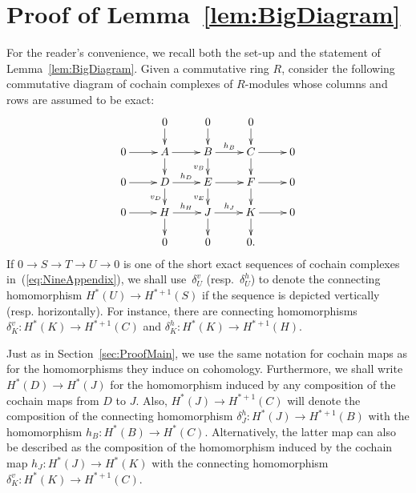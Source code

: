 \documentclass[11pt,a4paper]{amsart}
\theoremstyle{definition}
\begin{document}
\appendix

\section{Proof of Lemma~\ref{lem:BigDiagram}}

For the reader's convenience, we recall both the set-up and the statement of Lemma~\ref{lem:BigDiagram}. Given a commutative ring $R$, consider the following commutative diagram of cochain complexes of $R$-modules whose columns and rows are assumed to be exact:
\begin{equation}
\label{eq:NineAppendix}
\xymatrix@R0.5cm{
  &0 \ar[d]&  0\ar[d]&  0\ar[d]&  \\
0 \ar[r] &A\ar[d] \ar[r]& B \ar[d]_{v_B}\ar[r]^{h_B}& C \ar[r]\ar[d]& 0 \\
0 \ar[r] &D \ar[r]^{h_D}\ar[d]_{v_D}& E \ar[r]\ar[d]_{v_E}& F \ar[r]\ar[d]& 0 \\
0 \ar[r] &H \ar[r]^{h_H}\ar[d]& J \ar[r]^{h_J}\ar[d]& K \ar[r]\ar[d]& 0  \\
  &0 &  0&  0.& 
}\end{equation} 
If $0 \rightarrow S \rightarrow T \rightarrow U \rightarrow 0$ is one of the short exact sequences of cochain complexes in~(\ref{eq:NineAppendix}), we shall use~$\delta_{U}^v$ (resp.~$\delta_{U}^h$) to denote the connecting homomorphism $H^*(U) \rightarrow H^{*+1}(S)$ if the sequence is depicted vertically (resp. horizontally). For instance, there are connecting  homomorphisms $\delta_K^v \colon H^*(K) \to H^{*+1}(C)$ and $\delta_K^h \colon H^*(K) \to H^{*+1}(H)$.

Just as in Section~\ref{sec:ProofMain}, we use the same notation for cochain maps as for the homomorphisms they induce on cohomology. Furthermore, we shall write $H^*(D) \to H^*(J)$ for the homomorphism induced by any composition of the cochain maps from $D$ to $J$. Also, $H^*(J) \to H^{*+1}(C)$ will denote the composition of the connecting homomorphism $\delta^h_J \colon H^*(J) \to H^{*+1}(B)$ with the homomorphism $h_B \colon H^*(B) \to H^*(C)$. Alternatively, the latter map can also be described as the composition of the homomorphism induced by the cochain map $h_J \colon H^*(J) \to H^*(K)$ with the connecting homomorphism $\delta_K^v \colon H^*(K) \to H^{*+1}(C)$. 
\end{document}
